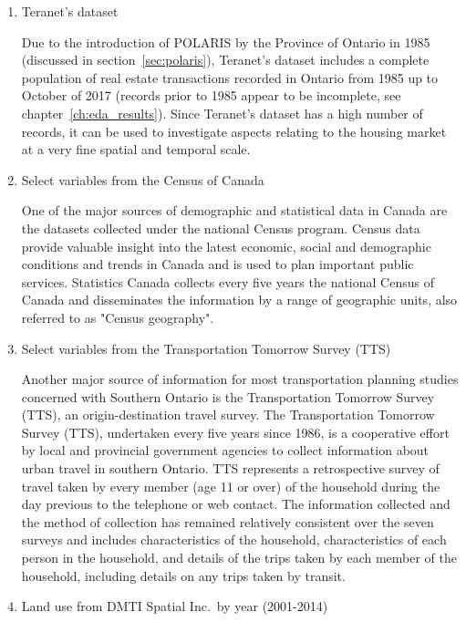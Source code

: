 \begin{enumerate}
    \item Teranet's dataset

    Due to the introduction of POLARIS by the Province of Ontario in 1985 (discussed in section~\ref{sec:polaris}), Teranet's dataset includes a complete population of real estate transactions recorded in Ontario from 1985 up to October of 2017 (records prior to 1985 appear to be incomplete, see chapter~\ref{ch:eda_results}).
    Since Teranet's dataset has a high number of records, it can be used to investigate aspects relating to the housing market at a very fine spatial and temporal scale.

    \item Select variables from the Census of Canada

    One of the major sources of demographic and statistical data in Canada are the datasets collected under the national Census program.
    Census data provide valuable insight into the latest economic, social and demographic conditions and trends in Canada and is used to plan important public services.
    Statistics Canada collects every five years the national Census of Canada and disseminates the information by a range of geographic units, also referred to as "Census geography"\cite{MapandDataLibrary2019}.

    \item Select variables from the Transportation Tomorrow Survey (TTS)

    Another major source of information for most transportation planning studies concerned with Southern Ontario is the Transportation Tomorrow Survey (TTS), an origin-destination travel survey\cite{DataManagementGroup2014}.
    The Transportation Tomorrow Survey (TTS), undertaken every five years since 1986, is a cooperative effort by local and provincial government agencies to collect information about urban travel in southern Ontario.
    TTS represents a retrospective survey of travel taken by every member (age 11 or over) of the household during the day previous to the telephone or web contact.
    The information collected and the method of collection has remained relatively consistent over the seven surveys and includes characteristics of the household, characteristics of each person in the household, and details of the trips taken by each member of the household, including details on any trips taken by transit\cite{Ashby2018}.

    \item Land use from DMTI Spatial Inc.\ by year (2001-2014)


\end{enumerate}
